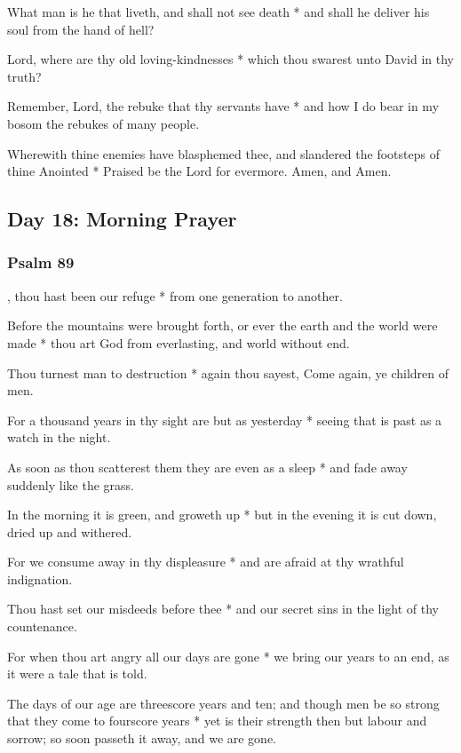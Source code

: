 What man is he that liveth, and shall not see death * and shall he deliver his soul from the hand of hell?

Lord, where are thy old loving-kindnesses * which thou swarest unto David in thy truth?

Remember, Lord, the rebuke that thy servants have * and how I do bear in my bosom the rebukes of many people.

Wherewith thine enemies have blasphemed thee, and slandered the footsteps of thine Anointed * Praised be the Lord for evermore. Amen, and Amen.

\subsection{Day 18: Morning Prayer}

\subsubsection{Psalm 89}


, thou hast been our refuge * from one generation to another.

Before the mountains were brought forth, or ever the earth and the world were made * thou art God from everlasting, and world without end.

Thou turnest man to destruction * again thou sayest, Come again, ye children of men.

For a thousand years in thy sight are but as yesterday * seeing that is past as a watch in the night.

As soon as thou scatterest them they are even as a sleep * and fade away suddenly like the grass.

In the morning it is green, and groweth up * but in the evening it is cut down, dried up and withered.

For we consume away in thy displeasure * and are afraid at thy wrathful indignation.

Thou hast set our misdeeds before thee * and our secret sins in the light of thy countenance.

For when thou art angry all our days are gone * we bring our years to an end, as it were a tale that is told.

The days of our age are threescore years and ten; and though men be so strong that they come to fourscore years * yet is their strength then but labour and sorrow; so soon passeth it away, and we are gone.

